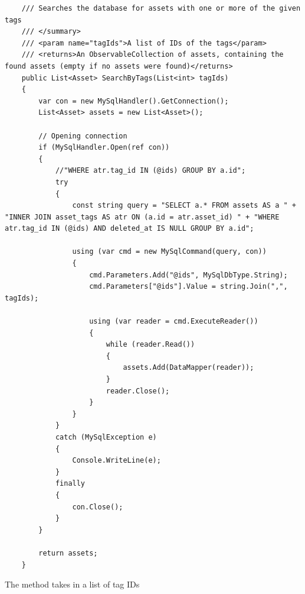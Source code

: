 \begin{listing}[H]
\begin{verbatim}
    /// Searches the database for assets with one or more of the given tags
    /// </summary>
    /// <param name="tagIds">A list of IDs of the tags</param>
    /// <returns>An ObservableCollection of assets, containing the found assets (empty if no assets were found)</returns>
    public List<Asset> SearchByTags(List<int> tagIds)
    {
        var con = new MySqlHandler().GetConnection();
        List<Asset> assets = new List<Asset>();
    
        // Opening connection
        if (MySqlHandler.Open(ref con))
        {
            //"WHERE atr.tag_id IN (@ids) GROUP BY a.id";
            try
            {
                const string query = "SELECT a.* FROM assets AS a " + "INNER JOIN asset_tags AS atr ON (a.id = atr.asset_id) " + "WHERE atr.tag_id IN (@ids) AND deleted_at IS NULL GROUP BY a.id";
    
                using (var cmd = new MySqlCommand(query, con))
                {
                    cmd.Parameters.Add("@ids", MySqlDbType.String);
                    cmd.Parameters["@ids"].Value = string.Join(",", tagIds);
    
                    using (var reader = cmd.ExecuteReader())
                    {
                        while (reader.Read())
                        {
                            assets.Add(DataMapper(reader));
                        }
                        reader.Close();
                    }
                }
            }
            catch (MySqlException e)
            {
                Console.WriteLine(e);
            }
            finally
            {
                con.Close();
            }
        }
    
        return assets;
    }
\end{verbatim}
\label{code:TagRepositorySearchByTags}
\end{listing}

The method takes in a list of tag IDs